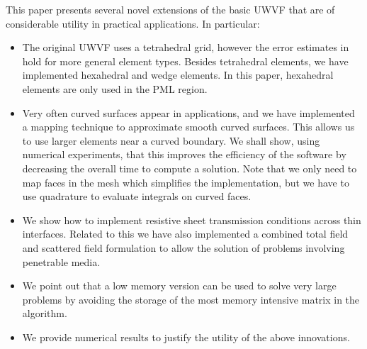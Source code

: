 \documentclass[a4paper,12pt]{article}
\begin{document}
This paper presents several novel extensions of the basic UWVF that
are of considerable utility in practical applications.  In particular:
\begin{itemize}
    \item The original UWVF uses a tetrahedral grid, however the
      error estimates in \cite{HMP13} hold for more general element
      types. Besides tetrahedral elements, we have implemented
      hexahedral and wedge elements. In this paper, hexahedral
      elements are only used in the PML region.
    \item Very often curved surfaces appear in applications, and we
      have implemented a mapping technique to approximate smooth
      curved surfaces.  This allows us to use larger elements near a
      curved boundary. We shall show, using numerical experiments,
      that this improves the efficiency of the software by decreasing
      the overall time to compute a solution.  Note that we only need
      to map faces in the mesh which simplifies the implementation,
      but we have to use quadrature to evaluate integrals on curved
      faces.
    \item We show how to implement resistive sheet transmission
      conditions across thin interfaces.  Related to this we have also
      implemented a combined total field and scattered field
      formulation to allow the solution of problems involving
      penetrable media.
\item We point out that a low memory version can be used to solve very
  large problems by avoiding the storage of the most memory intensive
  matrix in the algorithm.
    \item We provide numerical results to justify the utility of the
      above innovations.
\end{itemize}
\end{document}
